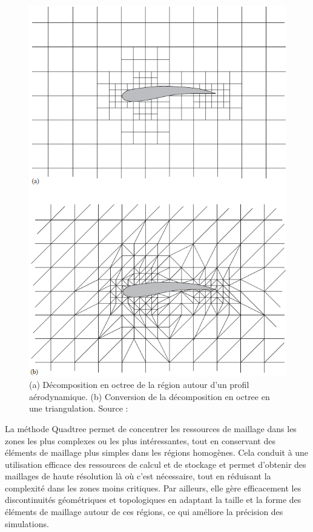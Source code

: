 \begin{figure}[!h]
    \centering
    \includegraphics[scale=0.6]{images/octree decomposition.png}
    \caption{(a) Décomposition en octree de la région autour d'un profil aérodynamique. (b) Conversion de la décomposition en octree en une triangulation. Source : \cite{baker2005mesh}}
    \label{fig:octree decomposition}
\end{figure}

La méthode Quadtree permet de concentrer les ressources de maillage dans les zones les plus complexes ou les plus intéressantes, tout en conservant des éléments de maillage plus simples dans les régions homogènes. Cela conduit à une utilisation efficace des ressources de calcul et de stockage et permet d'obtenir des maillages de haute résolution là où c'est nécessaire, tout en réduisant la complexité dans les zones moins critiques. Par ailleurs, elle gère efficacement les discontinuités géométriques et topologiques en adaptant la taille et la forme des éléments de maillage autour de ces régions, ce qui améliore la précision des simulations.

